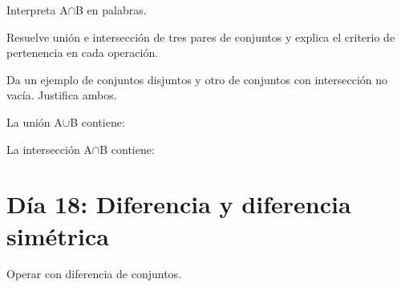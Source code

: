 \begin{activity}[id=dia-17-corta-06,type=short,weight=1]

Interpreta A\(\cap\)B en palabras.

\end{activity}

\begin{activity}[id=dia-17-desarrollo-01,type=long,weight=2]

Resuelve unión e intersección de tres pares de conjuntos y explica el criterio de pertenencia en cada operación.

\end{activity}

\begin{activity}[id=dia-17-desarrollo-02,type=long,weight=2]

Da un ejemplo de conjuntos disjuntos y otro de conjuntos con intersección no vacía. Justifica ambos.

\end{activity}

\begin{activity}[id=dia-17-opcion-01,type=choice,weight=1]

La unión A\(\cup\)B contiene:





\end{activity}

\begin{activity}[id=dia-17-opcion-02,type=choice,weight=1]

La intersección A\(\cap\)B contiene:





\end{activity}

\section{Día 18: Diferencia y diferencia simétrica}

\begin{lesson}[id=dia-18-lectura,weight=0]

Operar con diferencia de conjuntos.

\end{lesson}

